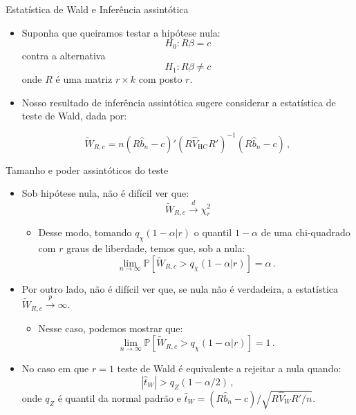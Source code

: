 \documentclass[11pt]{beamer}
\begin{document}
	\begin{frame}{Estatística de Wald e Inferência assintótica}
	\begin{itemize}
		\item Suponha que queiramos testar a hipótese nula:
		$$H_0: R \beta = c$$
		contra a alternativa 
		$$H_1: R\beta \neq c$$
		onde $R$  é uma matriz $r \times k$ com posto $r$.
		\item Nosso resultado de inferência assintótica sugere considerar {\color{blue}a estatística de teste de Wald}, dada por:
		
		$$\tilde{W}_{R,c} = n(R\hat{b}_n-c)'\left(R\hat{V}_{\text{HC}} R'\right)^{-1}(R\hat{b}_n-c)\, , $$
	\end{itemize}
	\end{frame}
	\begin{frame}{Tamanho e poder assintóticos do teste}
\begin{itemize}
	  \item Sob hipótese nula, não é difícil ver que:
	$$\tilde{W}_{R,c}  \overset{d}{\to} \chi^2_r$$
	\vspace{-1em}
	\begin{itemize}
		\item Desse modo, tomando $q_\chi(1-\alpha|r)$ o quantil $1-\alpha$ de uma chi-quadrado com $r$ graus de liberdade, temos que, sob a nula:
		$$\lim_{n \to\infty}\mathbb{P}\left[\tilde{W}_{R,c}  > q_\chi(1-\alpha|r)\right]=\alpha\, .$$
	\end{itemize}
	\item Por outro lado, não é difícil ver que, se nula {\color{blue}não é verdadeira}, a estatística $\tilde{W}_{R,c} \overset{p}{\to}\infty$.
	\begin{itemize}
		\item Nesse caso, podemos mostrar que:
		$$\lim_{n \to\infty}\mathbb{P}\left[\tilde{W}_{R,c}  > q_\chi(1-\alpha|r)\right] = 1\, .$$
	\end{itemize}
	\item No caso em que $r=1$ teste de Wald é equivalente a rejeitar a nula quando:
	$$|\hat{t}_W| > q_Z(1-\alpha/2)\, ,$$
	onde $q_Z$ é quantil da normal padrão e  $\hat{t}_W = (R\hat{b}_n-c)/\sqrt{R\hat{V}_W R'/n}$.
\end{itemize}
	\end{frame}
\end{document}

